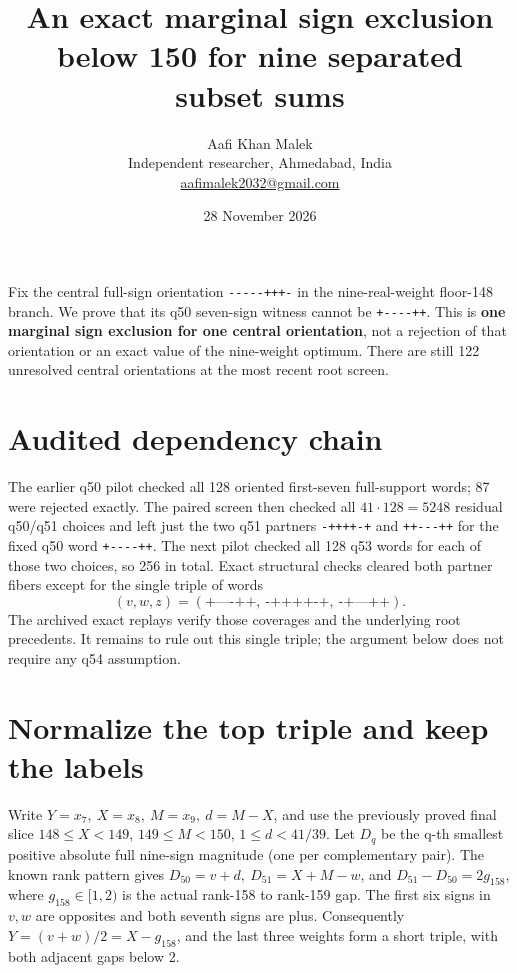 \documentclass[10pt,letterpaper]{article}
\title{An exact marginal sign exclusion below 150 for nine separated subset sums}
\author{Aafi Khan Malek\\ \small Independent researcher, Ahmedabad, India\\
\small\href{mailto:aafimalek2032@gmail.com}{aafimalek2032@gmail.com}}
\date{28 November 2026}
\begin{document}
\maketitle
Fix the central full-sign orientation \texttt{-\/-\/-\/-\/-+++-} in the
nine-real-weight floor-148 branch. We prove that its q50 seven-sign
witness cannot be \texttt{+-\/-\/-\/-++}. This is \textbf{one marginal
sign exclusion for one central orientation}, not a rejection of that
orientation or an exact value of the nine-weight optimum. There are
still 122 unresolved central orientations at the most recent root
screen.

\section{Audited dependency chain}\label{audited-dependency-chain}

The earlier q50 pilot checked all 128 oriented first-seven full-support
words; 87 were rejected exactly. The paired screen then checked all
\(41\cdot128=5248\) residual q50/q51 choices and left just the two q51
partners \texttt{-++++-+} and \texttt{++-\/-\/-++} for the fixed q50
word \texttt{+-\/-\/-\/-++}. The next pilot checked all 128 q53 words
for each of those two choices, so 256 in total. Exact structural checks
cleared both partner fibers except for the single triple of words \[
(v,w,z)=(\texttt{+----++},\ \texttt{-++++-+},\ \texttt{-+---++}).
\] The archived exact replays verify those coverages and the underlying
root precedents. It remains to rule out this single triple; the argument
below does not require any q54 assumption.

\section{Normalize the top triple and keep the
labels}\label{normalize-the-top-triple-and-keep-the-labels}

Write \(Y=x_7,\ X=x_8,\ M=x_9,\ d=M-X\), and use the previously proved
final slice \(148\le X<149\), \(149\le M<150\), \(1\le d<41/39\). Let
\(D_q\) be the q-th smallest positive absolute full nine-sign magnitude
(one per complementary pair). The known rank pattern gives
\(D_{50}=v+d,\ D_{51}=X+M-w\), and \(D_{51}-D_{50}=2g_{158}\), where
\(g_{158}\in[1,2)\) is the actual rank-158 to rank-159 gap. The first
six signs in \(v,w\) are opposites and both seventh signs are plus.
Consequently \(Y=(v+w)/2=X-g_{158}\), and the last three weights form a
short triple, with both adjacent gaps below 2.
\end{document}

